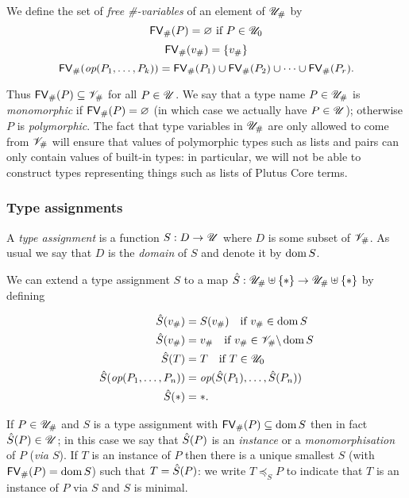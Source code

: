 \noindent We define the set of \textit{free \#-variables} of an element of ${\mathscr{U}_{\#}}$ by
$$
\mathsf{FV}_{\#}(P) = \varnothing \ \text{if $P \in \mathscr{U}_0$}
$$
$$
\mathsf{FV}_{\#}(v_\#) = \{v_\#\}
$$
$$
\mathsf{FV}_{\#}(\textit{op}(P_1, \ldots, P_k)) = \mathsf{FV}_{\#}(P_1) \cup \mathsf{FV}_{\#}(P_2) \cup \cdots \cup \mathsf{FV}_{\#}(P_r).
$$%

\noindent Thus $\mathsf{FV}_{\#}(P) \subseteq \mathscr{V}_\#$ for all $P \in \mathscr{U}$.  We say that a
type name $P \in {\mathscr{U}_{\#}}$ is \textit{monomorphic} if $\mathsf{FV}_{\#}(P) = \varnothing$ (in
which case we actually have $P \in \mathscr{U}$); otherwise $P$ is
\textit{polymorphic}.  The fact that type variables in ${\mathscr{U}_{\#}}$ are only
allowed to come from $\mathscr{V}_\#$ will ensure that values of polymorphic types such
as lists and pairs can only contain values of built-in types: in particular, we
will not be able to construct types representing things such as lists of Plutus
Core terms.


\subsubsection{Type assignments}
\label{sec:type-assignments}
A \textit{type assignment} is a function $S: D \rightarrow \mathscr{U}$ where $D$ is
some subset of $\mathscr{V}_\#$.  As usual we say that $D$ is the \textit{domain} of
$S$ and denote it by $\operatorname{dom} S$.%

\medskip
\noindent We can extend a type assignment $S$ to a map
$\Sext : \Unihash \disj \VarStar \rightarrow \Unihash \disj \VarStar$ by defining

\begin{align*}
    \Sext(v_\#) &= S(v_\#) \quad \text{if $v_\# \in \dom S$}\\
    \Sext(v_\#) &= v_\# \quad \text{if $v_\# \in \Var_\# \backslash \dom S$}\\
    \Sext(T) &= T \quad\text{if $T \in \Uni_0$}     \\
    \Sext(\op(P_1,\ldots,P_n)) &= \op(\Sext(P_1),\ldots,\Sext(P_n))\\
    \Sext(\star) &= \star.
\end{align*}%

\noindent If $P \in {\mathscr{U}_{\#}}$ and $S$ is a type assignment with $\mathsf{FV}_{\#}(P)
\subseteq \operatorname{dom} S$ then in fact $\hat{S}(P) \in \mathscr{U}$; in this case we say that
$\hat{S}(P)$ is an \textit{instance} or a \textit{monomorphisation} of $P$
(\textit{via $S$}).  If $T$ is an instance of $P$ then there is a unique
smallest $S$ (with $\mathsf{FV}_{\#}(P)=\operatorname{dom} S$) such that $T = \hat{S}(P)$: we write
$T\preceq_S P$ to indicate that $T$ is an instance of $P$ via $S$ and $S$ is
minimal.%

